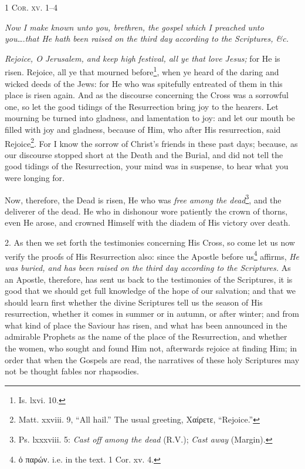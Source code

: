 
\textsc{1 Cor. xv. 1–4}

\emph{Now I make known unto you, brethren, the gospel which I preached unto you}….\emph{that He hath been raised on the third day according to the Scriptures, \&c.}

\emph{Rejoice, O Jerusalem, and keep high festival, all ye that love Jesus;} for He is risen. Rejoice, all ye that mourned before\footnote{Is. lxvi. 10.}, when ye heard of the daring and wicked deeds of the Jews: for He who was spitefully entreated of them in this place is risen again. And as the discourse concerning the Cross was a sorrowful one, so let the good tidings of the Resurrection bring joy to the hearers. Let mourning be turned into gladness, and lamentation to joy: and let our mouth be filled with joy and gladness, because of Him, who after His resurrection, said Rejoice\footnote{Matt. xxviii. 9, “All hail.” The usual greeting, \textgreek{Χαίρετε}, “Rejoice.”}. For I know the sorrow of Christ’s friends in these past days; because, as our discourse stopped short at the Death and the Burial, and did not tell the good tidings of the Resurrection, your mind was in suspense, to hear what you were longing for.

Now, therefore, the Dead is risen, He who was \emph{free among the dead}\footnote{Ps. lxxxviii. 5: \emph{Cast off among the dead} (R.V.); \emph{Cast away} (Margin).}, and the deliverer of the dead. He who in dishonour wore patiently the crown of thorns, even He arose, and crowned Himself with the diadem of His victory over death.

2. As then we set forth the testimonies concerning His Cross, so come let us now verify the proofs of His Resurrection also: since the Apostle before us\footnote{\textgreek{ὁ παρών}. i.e. in the text. 1 Cor. xv. 4.} affirms, \emph{He was buried, and has been raised on the third day according to the Scriptures.} As an Apostle, therefore, has sent us back to the testimonies of the Scriptures, it is good that we should get full knowledge of the hope of our salvation; and that we should learn first whether the divine Scriptures tell us the season of His resurrection, whether it comes in summer or in autumn, or after winter; and from what kind of place the Saviour has risen, and what has been announced in the admirable Prophets as the name of the place of the Resurrection, and whether the women, who sought and found Him not, afterwards rejoice at finding Him; in order that when the Gospels are read, the narratives of these holy Scriptures may not be thought fables nor rhapsodies.

